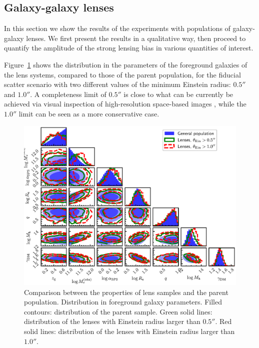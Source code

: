 \documentclass{aa}
\def\Fref#1{Figure~\ref{#1}\xspace}
\begin{document}
\subsection{Galaxy-galaxy lenses}\label{ssec:galbias}

In this section we show the results of the experiments with populations of galaxy-galaxy lenses.
We first present the results in a qualitative way, then proceed to quantify the amplitude of the strong lensing bias in various quantities of interest.

\Fref{fig:lenspars} shows the distribution in the parameters of the foreground galaxies of the lens systems, compared to those of the parent population, for the fiducial scatter scenario with two different values of the minimum Einstein radius: $0.5''$ and $1.0''$.
A completeness limit of $0.5''$ is close to what can be currently be achieved via visual inspection of high-resolution space-based images \cite{Gar++22}, while the $1.0''$ limit can be seen as a more conservative case.
\begin{figure}
\includegraphics[width=\textwidth]{lens_cornerplot.eps}
\caption{
Comparison between the properties of lens samples and the parent population. Distribution in foreground galaxy parameters.
Filled contours: distribution of the parent sample.
Green solid lines: distribution of the lenses with Einstein radius larger than $0.5''$.
Red solid lines: distribution of the lenses with Einstein radius larger than $1.0''$.
\label{fig:lenspars}
}
\end{figure}
\end{document}
